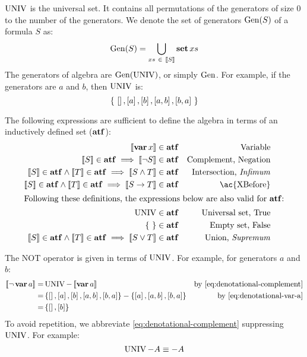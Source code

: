 $\operatorname{UNIV}$ is the universal set. 
It contains all permutations of the generators of size $0$ to the number of the generators.
%
We denote the set of generators $\mathrm{Gen}(S)$ of a formula $S$ as:
\begin{equation}
\mathrm{Gen}(S) = \bigcup_{xs ~\in~ \left[\!\left[S\right]\!\right]} \operatorname{\mathbf{set}} xs\label{eq:generators}
\end{equation}
%
The generators of \ac{algebra} are $\mathrm{Gen}(\operatorname{UNIV})$, or simply $\mathrm{Gen}$.
%
For example, if the generators are $a$ and $b$, then $\operatorname{UNIV}$ is:
%
\[
\left\{~ \left[  \right], \left[ a \right], \left[ b \right], \left[ a,b \right], \left[ b,a \right] ~\right\}
\]


The following expressions are sufficient to define the \ac{algebra} in terms of an inductively defined set ($\mathbf{atf}$):
%
\begin{subequations}
\label{def:algebraset}
\begin{align}
\denote{\var x} & \in \algebraset & \text{Variable}\label{def:algebraset-var}\\
\denote{S} \in \algebraset \implies \denote{\lnot S} & \in \algebraset & \text{Complement, Negation}\label{def:algebraset-compl}\\
\denote{S} \in \algebraset \land \denote{T} \in \algebraset \implies \denote{S \land T} & \in \algebraset & \text{Intersection, \emph{Infimum}}\label{def:algebraset-inf}\\
\denote{S} \in \algebraset \land \denote{T} \in \algebraset \implies \denote{\xbefore{S}{T}} & \in \algebraset & \text{\ac{XBefore}}\label{def:algebraset-xbefore}\\
\intertext{Following these definitions, the expressions below are also valid for $\algebraset$:}
\UNIV &\in \algebraset & \text{Universal set, True}\label{def:algebraset-true}\\
\emptyset &\in \algebraset & \text{Empty set, False}\label{def:algebraset-false}\\
\denote{S} \in \algebraset \land \denote{T} \in \algebraset \implies \denote{S \lor T} &\in \algebraset & \text{Union, \emph{Supremum}}\label{def:algebraset-sup}
\end{align}
\end{subequations}

The \ac{NOT} operator is given in terms of $\operatorname{UNIV}$.
For example, for generators $a$ and $b$:
\begin{align}
\denote{\lnot \var{a}} = & \UNIV - \denote{\var{a}} & \text{by \cref{eq:denotational-complement}}\nonumber\\
= & \left\{ \listsin{}, \listsin{a}, \listsin{b}, \listsin{a,b}, \listsin{b,a} \right\} - \left\{\listsin{a}, \listsin{a,b}, \listsin{b,a}\right\} & \text{by \cref{eq:denotational-var-a}} \nonumber\\
= & \left\{\listsin{}, \listsin{b}\right\}
\end{align}
To avoid repetition, we abbreviate \cref{eq:denotational-complement} suppressing $\operatorname{UNIV}$. 
For example:
\[
\operatorname{UNIV} - A \equiv -A
\]

